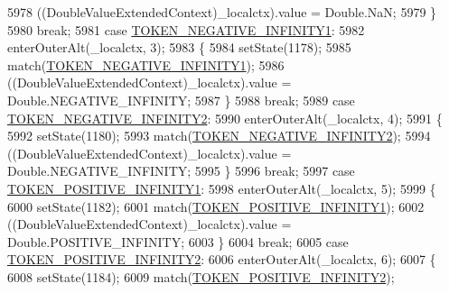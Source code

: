 \begin{DoxyCode}
5978          ((DoubleValueExtendedContext)\_localctx).value =  Double.NaN; 
5979         \}
5980         \textcolor{keywordflow}{break};
5981       \textcolor{keywordflow}{case} \hyperlink{classgov_1_1nasa_1_1jpf_1_1inspector_1_1server_1_1expression_1_1parser_1_1_expression_grammar_parser_a57ba05269c0bd3323cd60d799f404400}{TOKEN\_NEGATIVE\_INFINITY1}:
5982         enterOuterAlt(\_localctx, 3);
5983         \{
5984         setState(1178);
5985         match(\hyperlink{classgov_1_1nasa_1_1jpf_1_1inspector_1_1server_1_1expression_1_1parser_1_1_expression_grammar_parser_a57ba05269c0bd3323cd60d799f404400}{TOKEN\_NEGATIVE\_INFINITY1});
5986          ((DoubleValueExtendedContext)\_localctx).value =  Double.NEGATIVE\_INFINITY; 
5987         \}
5988         \textcolor{keywordflow}{break};
5989       \textcolor{keywordflow}{case} \hyperlink{classgov_1_1nasa_1_1jpf_1_1inspector_1_1server_1_1expression_1_1parser_1_1_expression_grammar_parser_ab417adbf89dc0b5716187cf20598132a}{TOKEN\_NEGATIVE\_INFINITY2}:
5990         enterOuterAlt(\_localctx, 4);
5991         \{
5992         setState(1180);
5993         match(\hyperlink{classgov_1_1nasa_1_1jpf_1_1inspector_1_1server_1_1expression_1_1parser_1_1_expression_grammar_parser_ab417adbf89dc0b5716187cf20598132a}{TOKEN\_NEGATIVE\_INFINITY2});
5994          ((DoubleValueExtendedContext)\_localctx).value =  Double.NEGATIVE\_INFINITY; 
5995         \}
5996         \textcolor{keywordflow}{break};
5997       \textcolor{keywordflow}{case} \hyperlink{classgov_1_1nasa_1_1jpf_1_1inspector_1_1server_1_1expression_1_1parser_1_1_expression_grammar_parser_ad569bc33cc328fd86383146af86da825}{TOKEN\_POSITIVE\_INFINITY1}:
5998         enterOuterAlt(\_localctx, 5);
5999         \{
6000         setState(1182);
6001         match(\hyperlink{classgov_1_1nasa_1_1jpf_1_1inspector_1_1server_1_1expression_1_1parser_1_1_expression_grammar_parser_ad569bc33cc328fd86383146af86da825}{TOKEN\_POSITIVE\_INFINITY1});
6002          ((DoubleValueExtendedContext)\_localctx).value =  Double.POSITIVE\_INFINITY; 
6003         \}
6004         \textcolor{keywordflow}{break};
6005       \textcolor{keywordflow}{case} \hyperlink{classgov_1_1nasa_1_1jpf_1_1inspector_1_1server_1_1expression_1_1parser_1_1_expression_grammar_parser_aa35db486aa7edd4c744c6f7a766383f9}{TOKEN\_POSITIVE\_INFINITY2}:
6006         enterOuterAlt(\_localctx, 6);
6007         \{
6008         setState(1184);
6009         match(\hyperlink{classgov_1_1nasa_1_1jpf_1_1inspector_1_1server_1_1expression_1_1parser_1_1_expression_grammar_parser_aa35db486aa7edd4c744c6f7a766383f9}{TOKEN\_POSITIVE\_INFINITY2});

\end{DoxyCode}
